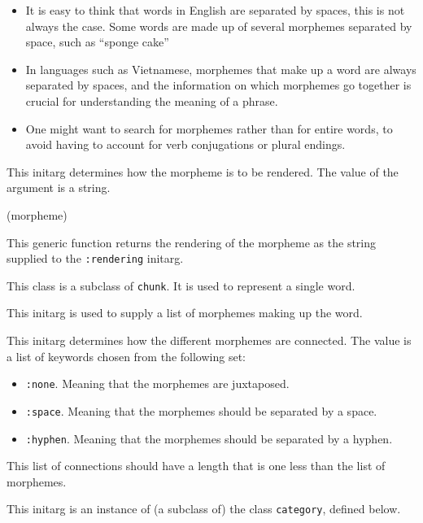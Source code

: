 \begin{itemize}
\item It is easy to think that words in English are separated by
  spaces, this is not always the case.  Some words are made up of
  several morphemes separated by space, such as ``sponge cake''
\item In languages such as Vietnamese, morphemes that make up a word
  are always separated by spaces, and the information on which
  morphemes go together is crucial for understanding the meaning of a
  phrase.
\item One might want to search for morphemes rather than for entire
  words, to avoid having to account for verb conjugations or plural
  endings.
\end{itemize}


This initarg determines how the morpheme is to be rendered.  The value
of the argument is a string.

 {(morpheme)}

This generic function returns the rendering of the morpheme as the
string supplied to the \texttt{:rendering} initarg.


This class is a subclass of \texttt{chunk}.  It is used to represent a
single word.


This initarg is used to supply a list of morphemes making up the
word.


This initarg determines how the different morphemes are connected.
The value is a list of \commonlisp{} keywords chosen from the
following set:

\begin{itemize}
\item \texttt{:none}.  Meaning that the morphemes are juxtaposed.
\item \texttt{:space}.  Meaning that the morphemes should be separated
  by a space.
\item \texttt{:hyphen}.  Meaning that the morphemes should be
  separated by a hyphen.
\end{itemize}

This list of connections should have a length that is one less than
the list of morphemes.


This initarg is an instance of (a subclass of) the class
\texttt{category}, defined below.

